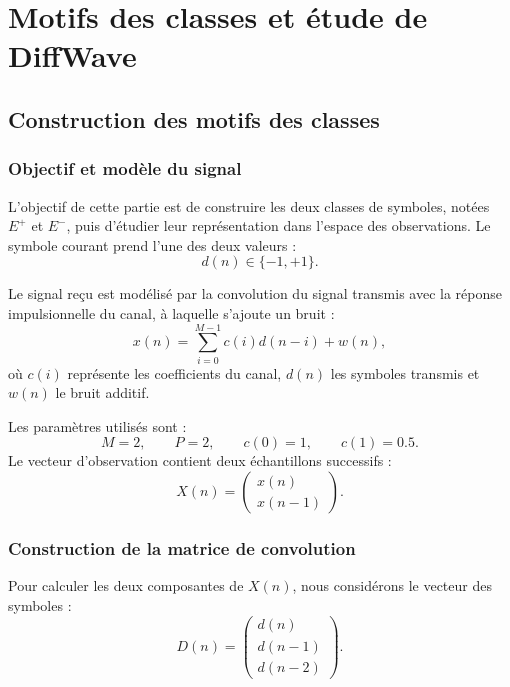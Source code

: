 
% 

\chapter{Motifs des classes et étude de DiffWave}

\section{Construction des motifs des classes}

\subsection{Objectif et modèle du signal}

L'objectif de cette partie est de construire les deux classes de symboles, notées $E^+$ et $E^-$, puis d'étudier leur représentation dans l'espace des observations. Le symbole courant prend l'une des deux valeurs :
\[
d(n)\in\{-1,+1\}.
\]

Le signal reçu est modélisé par la convolution du signal transmis avec la réponse impulsionnelle du canal, à laquelle s'ajoute un bruit :
\begin{equation}
x(n)=\sum_{i=0}^{M-1}c(i)d(n-i)+w(n),
\end{equation}
où $c(i)$ représente les coefficients du canal, $d(n)$ les symboles transmis et $w(n)$ le bruit additif.

Les paramètres utilisés sont :
\[
M=2,\qquad P=2,\qquad c(0)=1,\qquad c(1)=0.5.
\]
Le vecteur d'observation contient deux échantillons successifs :
\[
X(n)=
\begin{pmatrix}
x(n)\\
x(n-1)
\end{pmatrix}.
\]

\subsection{Construction de la matrice de convolution}

Pour calculer les deux composantes de $X(n)$, nous considérons le vecteur des symboles :
\[
D(n)=
\begin{pmatrix}
d(n)\\
d(n-1)\\
d(n-2)
\end{pmatrix}.
\]

